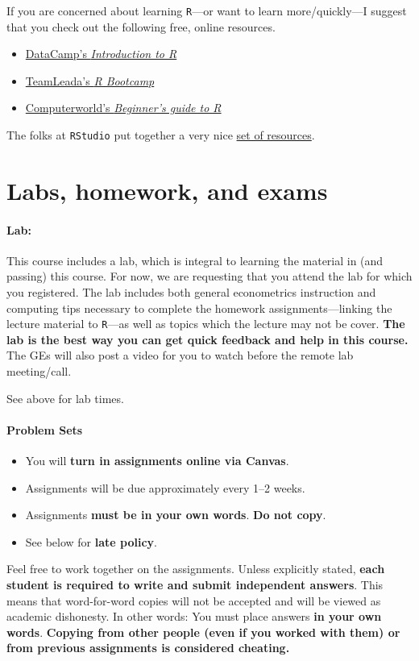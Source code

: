 \documentclass[10pt]{article}
\begin{document}
If you are concerned about learning \texttt{R}---or want to learn more/quickly---I suggest that you check out the following free, online resources.
\begin{itemize}
  \item \href{https://www.datacamp.com/courses/free-introduction-to-r}{DataCamp's \textit{Introduction to R}}
  \item \href{https://www.teamleada.com/courses/r-bootcamp}{TeamLeada's \textit{R Bootcamp}}
  \item \href{https://www.computerworld.com/article/2497143/business-intelligence-beginner-s-guide-to-r-introduction.html}{Computerworld's \textit{Beginner's guide to R}}
\end{itemize}
The folks at \texttt{RStudio} put together a very nice \href{https://education.rstudio.com/learn/beginner/}{set of resources}.

\section*{Labs, homework, and exams}

\paragraph{Lab:} This course includes a lab, which is integral to learning the material in (and passing) this course. For now, we are requesting that you attend the lab for which you registered. The lab includes both general econometrics instruction and computing tips necessary to complete the homework assignments---linking the lecture material to \texttt{R}---as well as topics which the lecture may not be cover. \textbf{The lab is the best way you can get quick feedback and help in this course.} The GEs will also post a video for you to watch before the remote lab meeting/call.

See above for lab times.

\paragraph{Problem Sets}
\begin{itemize}
  \item You will \textbf{turn in assignments online via Canvas}.
  \item Assignments will be due approximately every 1--2 weeks.
  \item Assignments \textbf{must be in your own words}. \textbf{Do not copy}.
  \item See below for \textbf{late policy}.
\end{itemize}
Feel free to work together on the assignments. Unless explicitly stated, \textbf{each student is required to write and submit independent answers}. This means that word-for-word copies will not be accepted and will be viewed as academic dishonesty. In other words: You must place answers \textbf{in your own words}. \textbf{Copying from other people (even if you worked with them) or from previous assignments is considered cheating.}
\end{document}
